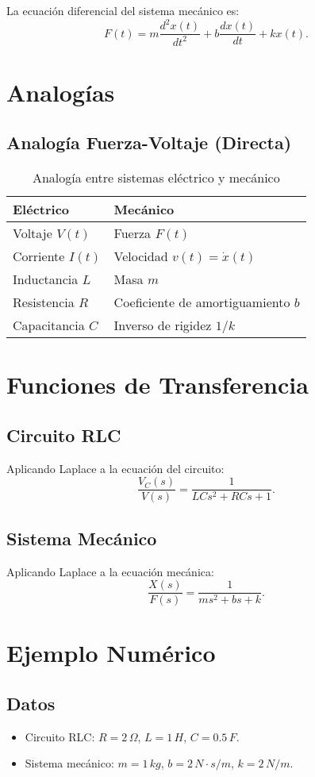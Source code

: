 \documentclass[12pt, a4paper]{article}
\begin{document}
La ecuación diferencial del sistema mecánico es:
\[
F(t) = m \frac{d^2x(t)}{dt^2} + b \frac{dx(t)}{dt} + k x(t).
\]

\section{Analogías}
\subsection{Analogía Fuerza-Voltaje (Directa)}
\begin{table}[h]
\centering
\caption{Analogía entre sistemas eléctrico y mecánico}
\begin{tabular}{ll}
\toprule
\textbf{Eléctrico} & \textbf{Mecánico} \\
\midrule
Voltaje $V(t)$ & Fuerza $F(t)$ \\
Corriente $I(t)$ & Velocidad $v(t) = \dot{x}(t)$ \\
Inductancia $L$ & Masa $m$ \\
Resistencia $R$ & Coeficiente de amortiguamiento $b$ \\
Capacitancia $C$ & Inverso de rigidez $1/k$ \\
\bottomrule
\end{tabular}
\end{table}

\section{Funciones de Transferencia}
\subsection{Circuito RLC}
Aplicando Laplace a la ecuación del circuito:
\[
\frac{V_C(s)}{V(s)} = \frac{1}{L C s^2 + R C s + 1}.
\]

\subsection{Sistema Mecánico}
Aplicando Laplace a la ecuación mecánica:
\[
\frac{X(s)}{F(s)} = \frac{1}{m s^2 + b s + k}.
\]

\section{Ejemplo Numérico}
\subsection{Datos}
\begin{itemize}
    \item Circuito RLC: $R = 2\,\Omega$, $L = 1\,H$, $C = 0.5\,F$.
    \item Sistema mecánico: $m = 1\,kg$, $b = 2\,N\cdot s/m$, $k = 2\,N/m$.
\end{itemize}
\end{document}
